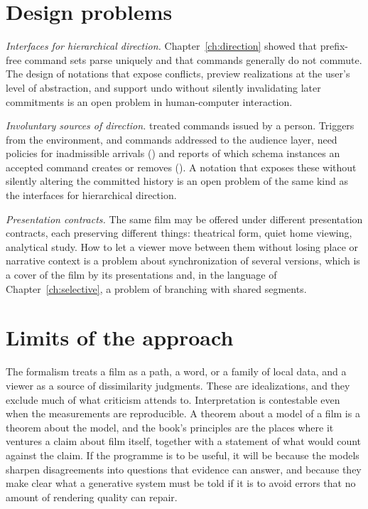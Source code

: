 \section{Design problems}

\emph{Interfaces for hierarchical direction.} Chapter~\ref{ch:direction} showed that prefix-free command sets parse uniquely and that commands generally do not commute. The design of notations that expose conflicts, preview realizations at the user's level of abstraction, and support undo without silently invalidating later commitments is an open problem in human-computer interaction.

\emph{Involuntary sources of direction.}  treated commands issued by a person. Triggers from the environment, and commands addressed to the audience layer, need policies for inadmissible arrivals () and reports of which schema instances an accepted command creates or removes (). A notation that exposes these without silently altering the committed history is an open problem of the same kind as the interfaces for hierarchical direction.

\emph{Presentation contracts.} The same film may be offered under different presentation contracts, each preserving different things: theatrical form, quiet home viewing, analytical study. How to let a viewer move between them without losing place or narrative context is a problem about synchronization of several versions, which is a cover of the film by its presentations and, in the language of Chapter~\ref{ch:selective}, a problem of branching with shared segments.

\section{Limits of the approach}

The formalism treats a film as a path, a word, or a family of local data, and a viewer as a source of dissimilarity judgments. These are idealizations, and they exclude much of what criticism attends to. Interpretation is contestable even when the measurements are reproducible. A theorem about a model of a film is a theorem about the model, and the book's principles are the places where it ventures a claim about film itself, together with a statement of what would count against the claim. If the programme is to be useful, it will be because the models sharpen disagreements into questions that evidence can answer, and because they make clear what a generative system must be told if it is to avoid errors that no amount of rendering quality can repair.
